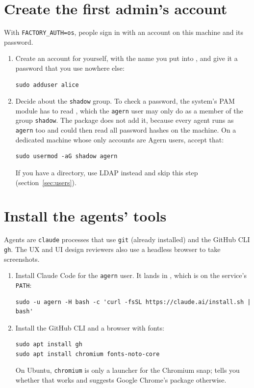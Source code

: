 \section{Create the first admin's account}\label{sec:first-admin}

With \texttt{FACTORY\_AUTH=os}, people sign in with an account on this machine and its password.

\begin{enumerate}
  \item Create an account for yourself, with the name you put into , and give
    it a password that you use nowhere else:
\begin{lstlisting}
sudo adduser alice
\end{lstlisting}
  \item Decide about the \texttt{shadow} group. To check a password, the system's PAM module has to
    read , which the \texttt{agern} user may only do as a member of the group
    \texttt{shadow}. The package does not add it, because every agent runs as \texttt{agern} too
    and could then read all password hashes on the machine. On a dedicated machine whose only
    accounts are Agern users, accept that:
\begin{lstlisting}
sudo usermod -aG shadow agern
\end{lstlisting}
    If you have a directory, use LDAP instead and skip this step (section~\ref{sec:users}).
\end{enumerate}

\section{Install the agents' tools}\label{sec:agent-tools}

Agents are \texttt{claude} processes that use \texttt{git} (already installed) and the GitHub CLI
\texttt{gh}. The UX and UI design reviewers also use a headless browser to take screenshots.

\begin{enumerate}
  \item Install Claude Code for the \texttt{agern} user. It lands in
    , which is on the service's \texttt{PATH}:
\begin{lstlisting}
sudo -u agern -H bash -c 'curl -fsSL https://claude.ai/install.sh | bash'
\end{lstlisting}
  \item Install the GitHub CLI and a browser with fonts:
\begin{lstlisting}
sudo apt install gh
sudo apt install chromium fonts-noto-core
\end{lstlisting}
    On Ubuntu, \texttt{chromium} is only a launcher for the Chromium snap; 
    tells you whether that works and suggests Google Chrome's package otherwise.
\end{enumerate}

